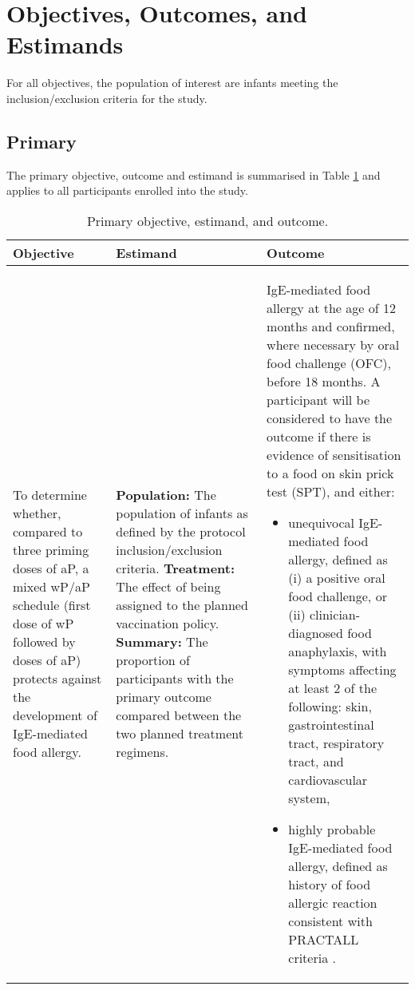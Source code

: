 \documentclass{bmcart}
\begin{document}
\section*{Objectives, Outcomes, and Estimands}

For all objectives, the population of interest are infants meeting the inclusion/exclusion criteria for the study.

\subsection*{Primary}

The primary objective, outcome and estimand is summarised in Table \ref{tab:objective-estimands-outcomes-primary} and applies to all participants enrolled into the study.

\begin{table}[h!]
	\caption{Primary objective, estimand, and outcome.}
	\label{tab:objective-estimands-outcomes-primary}
	\begin{tabular}{p{4cm}p{4cm}p{4cm}}
		Objective & Estimand & Outcome \\ \hline
		To determine whether, compared to three priming doses of aP, a mixed wP/aP schedule (first dose of wP followed by doses of aP) protects against the development of IgE-mediated food allergy.
	& \textbf{Population:} The population of infants as defined by the protocol inclusion/exclusion criteria. \newline \textbf{Treatment:} The effect of being assigned to the planned vaccination policy. \newline \textbf{Summary:} The proportion of participants with the primary outcome compared between the two planned treatment regimens.
		&
		IgE-mediated food allergy at the age of 12 months and confirmed, where necessary by oral food challenge (OFC), before 18 months.
		A participant will be considered to have the outcome if there is evidence of sensitisation to a food on skin prick test (SPT), and either:
		\begin{itemize}
			\item unequivocal IgE-mediated food allergy, defined as (i) a positive oral food challenge, or (ii) clinician-diagnosed food anaphylaxis, with symptoms affecting at least 2 of the following: skin, gastrointestinal tract, respiratory tract, and cardiovascular system,
			\item highly probable IgE-mediated food allergy, defined as history of food allergic reaction consistent with PRACTALL criteria \cite{sampson2012standardizing}.
		\end{itemize} \\
		\hline
	\end{tabular}
\end{table}
\end{document}
